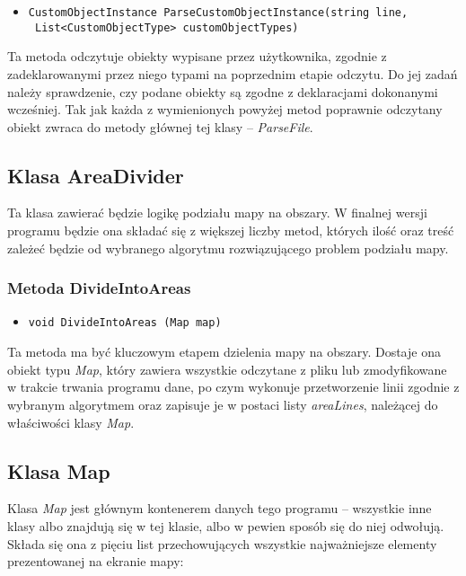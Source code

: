 \documentclass[a4paper,11pt]{article}
\newcommand\tab[1][0.6cm]{\hspace*{#1}}
\begin{document}
\begin{itemize}
\item \begin{lstlisting}
CustomObjectInstance ParseCustomObjectInstance(string line,
 List<CustomObjectType> customObjectTypes)
\end{lstlisting}
\end{itemize}

\tab Ta metoda odczytuje obiekty wypisane przez użytkownika, zgodnie z zadeklarowanymi przez niego typami na poprzednim etapie odczytu. Do jej zadań należy sprawdzenie, czy podane obiekty są zgodne z deklaracjami dokonanymi wcześniej. Tak jak każda z wymienionych powyżej metod poprawnie odczytany obiekt zwraca do metody głównej tej klasy -- \textit{ParseFile}.

\subsection{Klasa AreaDivider}

\tab Ta klasa zawierać będzie logikę podziału mapy na obszary. W finalnej wersji programu będzie ona składać się z większej liczby metod, których ilość oraz treść zależeć będzie od wybranego algorytmu rozwiązującego problem podziału mapy. 

\subsubsection{Metoda DivideIntoAreas}

\begin{itemize}
\item \begin{lstlisting}
void DivideIntoAreas (Map map)
\end{lstlisting}
\end{itemize}

\tab Ta metoda ma być kluczowym etapem dzielenia mapy na obszary. Dostaje ona obiekt typu \textit{Map}, który zawiera wszystkie odczytane z pliku lub zmodyfikowane w trakcie trwania programu dane, po czym wykonuje przetworzenie linii zgodnie z wybranym algorytmem oraz zapisuje je w postaci listy \textit{areaLines}, należącej do właściwości klasy \textit{Map}.

\subsection{Klasa Map}

\tab Klasa \textit{Map} jest głównym kontenerem danych tego programu -- wszystkie inne klasy albo znajdują się w tej klasie, albo w pewien sposób się do niej odwołują. Składa się ona z pięciu list przechowujących wszystkie najważniejsze elementy prezentowanej na ekranie mapy:
\end{document}

